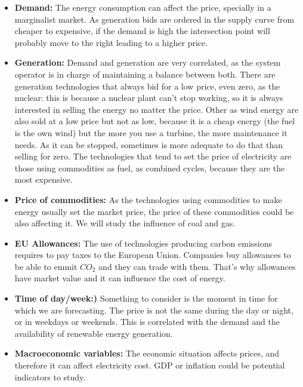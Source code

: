 \begin{itemize}
    \item \textbf{Demand:} The energy consumption can affect the price, specially in a marginalist market. As generation bids are ordered in the supply curve from cheaper to expensive, if the demand is high the intersection point will probably move to the right leading to a higher price.
    \item \textbf{Generation:} Demand and generation are very correlated, as the system operator is in charge of maintaining a balance between both. There are generation technologies that always bid for a low price, even zero, as the nuclear: this is because a nuclear plant can't stop working, so it is always interested in selling the energy no matter the price. Other as wind energy are also sold at a low price but not as low, because it is a cheap energy (the fuel is the own wind) but the more you use a turbine, the more maintenance it needs. As it can be stopped, sometimes is more adequate to do that than selling for zero. The technologies that tend to set the price of electricity are those using commodities as fuel, as combined cycles, because they are the most expensive.
    \item \textbf{Price of commodities:} As the technologies using commodities to make energy usually set the market price, the price of these commodities could be also affecting it. We will study the influence of coal and gas.
    \item \textbf{EU Allowances:} The use of technologies producing carbon emissions requires to pay taxes to the European Union. Companies buy allowances to be able to emmit $CO_2$ and they can trade with them. That's why allowances have market value and it can influence the cost of energy.
    \item \textbf{Time of day/week:)} Something to consider is the moment in time for which we are forecasting. The price is not the same during the day or night, or in weekdays or weekends. This is correlated with the demand and the availability of renewable energy generation.
    \item \textbf{Macroeconomic variables:} The economic situation affects prices, and therefore it can affect electricity cost. GDP or inflation could be potential indicators to study.
\end{itemize}